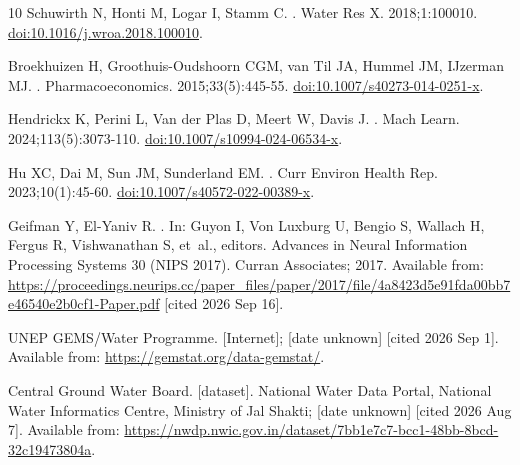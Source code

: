 \documentclass[10pt,letterpaper]{article}
\begin{document}
\begin{thebibliography}{10}
{Schuwirth} N, {Honti} M, {Logar} I, {Stamm} C.
.
\newblock Water Res X. 2018;1:100010.
\newblock \href {http://dx.doi.org/10.1016/j.wroa.2018.100010}
  {doi:10.1016/j.wroa.2018.100010}.

{Broekhuizen} H, {Groothuis-Oudshoorn} CGM, {van Til} JA, {Hummel} JM,
  {IJzerman} MJ.
.
\newblock Pharmacoeconomics. 2015;33(5):445-55.
\newblock \href {http://dx.doi.org/10.1007/s40273-014-0251-x}
  {doi:10.1007/s40273-014-0251-x}.

{Hendrickx} K, {Perini} L, {Van der Plas} D, {Meert} W, {Davis} J.
.
\newblock Mach Learn. 2024;113(5):3073-110.
\newblock \href {http://dx.doi.org/10.1007/s10994-024-06534-x}
  {doi:10.1007/s10994-024-06534-x}.

{Hu} XC, {Dai} M, {Sun} JM, {Sunderland} EM.
.
\newblock Curr Environ Health Rep. 2023;10(1):45-60.
\newblock \href {http://dx.doi.org/10.1007/s40572-022-00389-x}
  {doi:10.1007/s40572-022-00389-x}.

{Geifman} Y, {El-Yaniv} R.
.
\newblock In: {Guyon} I, {Von Luxburg} U, {Bengio} S, {Wallach} H, {Fergus} R,
  {Vishwanathan} S, et~al., editors. Advances in Neural Information Processing
  Systems 30 (NIPS 2017). Curran Associates; 2017. Available from:
  \url{https://proceedings.neurips.cc/paper_files/paper/2017/file/4a8423d5e91fda00bb7e46540e2b0cf1-Paper.pdf}
  [cited 2026 Sep 16].

{UNEP GEMS/Water Programme}.
 [Internet]; [date unknown] [cited 2026 Sep 1].
\newblock Available from: \url{https://gemstat.org/data-gemstat/}.

{Central Ground Water Board}.
 [dataset]. National Water Data Portal, National Water
  Informatics Centre, Ministry of Jal Shakti; [date unknown] [cited 2026 Aug
  7].
\newblock Available from:
  \url{https://nwdp.nwic.gov.in/dataset/7bb1e7c7-bcc1-48bb-8bcd-32c19473804a}.


\end{thebibliography}
\end{document}
